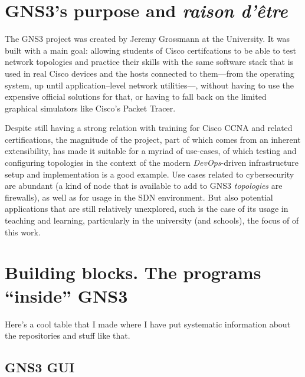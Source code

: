 
\section{GNS3's purpose and \emph{raison d'être}}
\label{sec:gns3why}

The GNS3 project was created by Jeremy Grossmann at the University. %
It was built with a main goal: allowing students of Cisco certifcations to be able to test network topologies and practice their skills with the same software stack that is used in real Cisco devices and the hosts connected to them---from the operating system, up until application--level network utilities---, without having to use the expensive official solutions for that, or having to fall back on the limited graphical simulators like Cisco's Packet Tracer. %

Despite still having a strong relation with training for Cisco CCNA and related certifications, the magnitude of the project, part of which comes from an inherent extensibility, has made it suitable for a myriad of use-cases, of which testing and configuring topologies in the context of the modern \emph{DevOps}-driven infrastructure setup and implementation is a good example. %
Use cases related to cybersecurity are abundant (a kind of node that is available to add to GNS3 \emph{topologies} are firewalls), as well as for usage in the SDN environment. %
But also potential applications that are still relatively unexplored, such is the case of its usage in teaching and learning, particularly in the university (and schools), the focus of of this work.


\section{Building blocks. The programs ``inside'' GNS3}
\label{sec:gns3buildingblocks}

Here's a cool table that I made where I have put systematic information about the repositories and stuff like that.



\subsection{GNS3 GUI}
\label{subsec:gns3gui}

